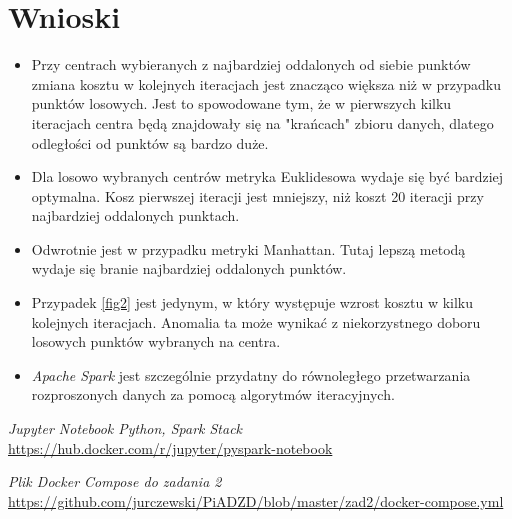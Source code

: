\documentclass{classrep}
\begin{document}
\section{Wnioski}

\begin{itemize}
    \item Przy centrach wybieranych z najbardziej oddalonych od siebie punktów zmiana kosztu w kolejnych iteracjach jest znacząco większa niż w przypadku punktów losowych. Jest to spowodowane tym, że w pierwszych kilku iteracjach centra będą znajdowały się na "krańcach" zbioru danych, dlatego odległości od punktów są bardzo duże.
    \item Dla losowo wybranych centrów metryka Euklidesowa wydaje się być bardziej optymalna. Kosz pierwszej iteracji jest mniejszy, niż koszt 20 iteracji przy najbardziej oddalonych punktach. 
    \item Odwrotnie jest w przypadku metryki Manhattan. Tutaj lepszą metodą wydaje się branie najbardziej oddalonych punktów.
    \item Przypadek \ref{fig2} jest jedynym, w który występuje wzrost kosztu w kilku kolejnych iteracjach. Anomalia ta może wynikać z niekorzystnego doboru losowych punktów wybranych na centra.
    \item \textit{Apache Spark} jest szczególnie przydatny do równoległego przetwarzania rozproszonych danych za pomocą algorytmów iteracyjnych.

\end{itemize}


\nocite{*}
\begin{thebibliography}{0}
    
    \textsl{Jupyter Notebook Python, Spark Stack}
    \url{https://hub.docker.com/r/jupyter/pyspark-notebook}

    \textsl{Plik Docker Compose do zadania 2}
    \url{https://github.com/jurczewski/PiADZD/blob/master/zad2/docker-compose.yml}

    
\end{thebibliography}
\end{document}
